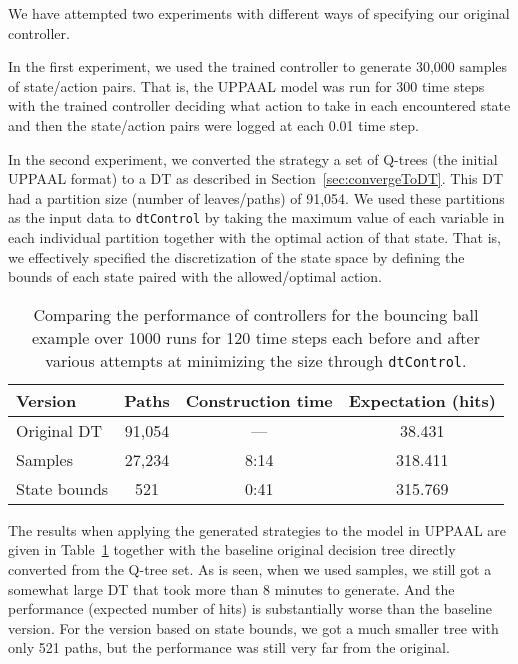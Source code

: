 We have attempted two experiments with different ways of specifying our original
controller.

In the first experiment, we used the trained controller to generate 30,000
samples of state/action pairs. That is, the UPPAAL model was run for 300
time steps with the trained controller deciding what action to take in each
encountered state and then the state/action pairs were logged at each 0.01
time step.

In the second experiment, we converted the strategy a set of Q-trees (the
initial UPPAAL format) to a DT as described in Section~\ref{sec:convergeToDT}.
This DT had a partition size (number of leaves/paths) of 91,054. We used these
partitions as the input data to \texttt{dtControl} by taking the maximum value
of each variable in each individual partition together with the optimal action
of that state. That is, we effectively specified the discretization of the state
space by defining the bounds of each state paired with the allowed/optimal
action.

\begin{table}[ht]
    \centering
    \caption{%
        Comparing the performance of controllers for the bouncing ball example
        over 1000 runs for 120 time steps each before and after various attempts
        at minimizing the size through \texttt{dtControl}.  
    }\label{tab:dtcontrolTable}
    \begin{tabular}[t]{lccc}
        \toprule
        Version & Paths & Construction time & Expectation (hits) \\
        \midrule
        Original DT & 91,054 & --- & 38.431 \\
        Samples & 27,234 & 8:14 & 318.411 \\
        State bounds & 521 & 0:41 & 315.769 \\
        \bottomrule
    \end{tabular}
\end{table}


The results when applying the generated strategies to the model in UPPAAL are
given in Table~\ref{tab:dtcontrolTable} together with the baseline original
decision tree directly converted from the Q-tree set. As is seen, when we used
samples, we still got a somewhat large DT that took more than 8 minutes to
generate. And the performance (expected number of hits) is substantially worse
than the baseline version. For the version based on state bounds, we got a much
smaller tree with only 521 paths, but the performance was still very far from
the original.


